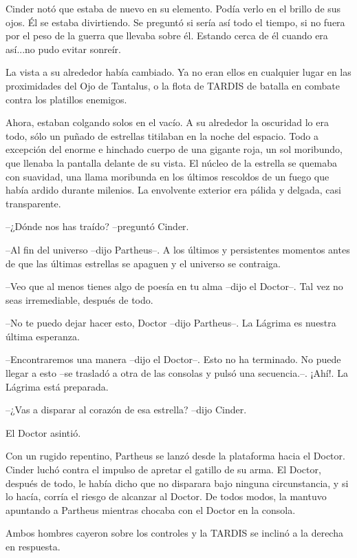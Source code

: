 Cinder notó que estaba de nuevo en su elemento. Podía verlo en el brillo de sus ojos. Él se estaba divirtiendo. Se preguntó si sería así todo el tiempo, si no fuera por el peso de la guerra que llevaba sobre él. Estando cerca de él cuando era así...no pudo evitar sonreír.

La vista a su alrededor había cambiado. Ya no eran ellos en cualquier lugar en las proximidades del Ojo de Tantalus, o la flota de TARDIS de batalla en combate contra los platillos enemigos.

Ahora, estaban colgando solos en el vacío. A su alrededor la oscuridad lo era todo, sólo un puñado de estrellas titilaban en la noche del espacio. Todo a excepción del enorme e hinchado cuerpo de una gigante roja, un sol moribundo, que llenaba la pantalla delante de su vista. El núcleo de la estrella se quemaba con suavidad, una llama moribunda en los últimos rescoldos de un fuego que había ardido durante milenios. La envolvente exterior era pálida y delgada, casi transparente.



--¿Dónde nos has traído? --preguntó Cinder.

--Al fin del universo --dijo Partheus--. A los últimos y persistentes momentos antes de que las últimas estrellas se apaguen y el universo se contraiga.

--Veo que al menos tienes algo de poesía en tu alma --dijo el Doctor--. Tal vez no seas irremediable, después de todo.

--No te puedo dejar hacer esto, Doctor --dijo Partheus--. La Lágrima es nuestra última esperanza.

--Encontraremos una manera --dijo el Doctor--. Esto no ha terminado. No puede llegar a esto --se trasladó a otra de las consolas y pulsó una secuencia.--. ¡Ahí!. La Lágrima está preparada.

--¿Vas a disparar al corazón de esa estrella? --dijo Cinder.

El Doctor asintió.

Con un rugido repentino, Partheus se lanzó desde la plataforma hacia el Doctor. Cinder luchó contra el impulso de apretar el gatillo de su arma. El Doctor, después de todo, le había dicho que no disparara bajo ninguna circunstancia, y si lo hacía, corría el riesgo de alcanzar al Doctor. De todos modos, la mantuvo apuntando a Partheus mientras chocaba con el Doctor en la consola.

Ambos hombres cayeron sobre los controles y la TARDIS se inclinó a la derecha en respuesta.

